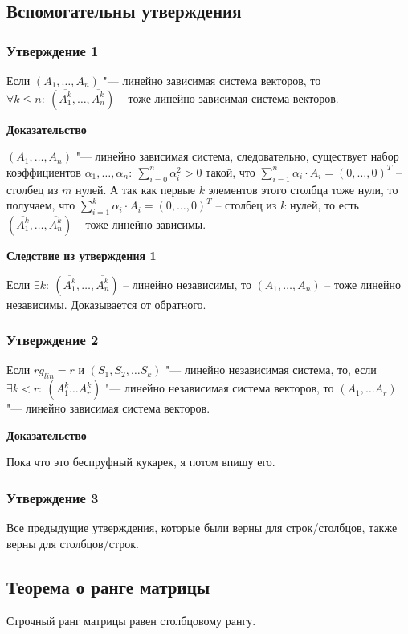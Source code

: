 \documentclass{article}
\begin{document}
\subsection{Вспомогательны утверждения}
\subsubsection{Утверждение 1}
Если $(A_1,\ldots,A_n)$ "--- линейно зависимая система векторов, то $\forall k \leq n:\:(\overline{A^k_1},\ldots,\overline{A^k_n})$ -- тоже линейно зависимая система векторов.

\textbf{Доказательство}

$(A_1,\ldots,A_n)$ "--- линейно зависимая система, следовательно, существует набор коэффициентов $\alpha_1,\ldots,\alpha_n:\: \sum\limits_{i = 0}^n \alpha_i^2 > 0$ такой, что $\sum\limits_{i=1}^n \alpha_i\cdot A_i = (0,\ldots,0)^T$ -- столбец из $m$ нулей. А так как первые $k$ элементов этого столбца тоже нули, то получаем, что $\sum\limits_{i=1}^k \alpha_i\cdot A_i=(0,\ldots,0)^T$ -- столбец из $k$ нулей, то есть $(\overline{A_1^k},\ldots,\overline{A^k_n})$ -- тоже линейно зависимы.

\textbf{Следствие из утверждения 1}

Если $\exists k:\: (\overline{A_1^k},\ldots,\overline{A^k_n})$ -- линейно независимы, то $(A_1,\ldots,A_n)$ -- тоже линейно независимы. Доказывается от обратного.

\subsubsection{Утверждение 2}
Если $rg_{lin} = r$ и $(S_1, S_2, \ldots S_k)$ "--- линейно независимая система, то, если $\exists k < r:\:(\overline{A^k_1}\ldots \overline{A^k_r})$ "--- линейно независимая система векторов, то $(A_1, \ldots A_r)$ "--- линейно зависимая система векторов.

\textbf{Доказательство}

Пока что это беспруфный кукарек, я потом впишу его.

\subsubsection{Утверждение 3}
Все предыдущие утверждения, которые были верны для строк/столбцов, также верны для столбцов/строк.

\subsection{Теорема о ранге матрицы}
Строчный ранг матрицы равен столбцовому рангу.
\end{document}
